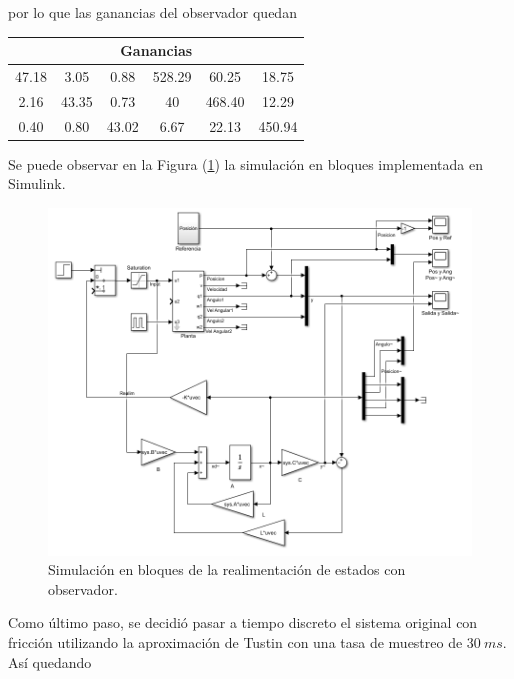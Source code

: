 por lo que las ganancias del observador quedan

\begin{table}[H]
\centering
\begin{tabular}{@{}cccccc@{}}
\toprule
\multicolumn{6}{c}{Ganancias}                    \\ \midrule
47.18 & 3.05  & 0.88  & 528.29 & 60.25  & 18.75  \\
2.16  & 43.35 & 0.73  & 40     & 468.40 & 12.29  \\
0.40  & 0.80  & 43.02 & 6.67   & 22.13  & 450.94 \\ \bottomrule
\end{tabular}
\end{table}

Se puede observar en la Figura (\ref{fig:obsv}) la simulación en bloques implementada en Simulink.

\begin{figure}[H]
	\centering
	\includegraphics[width=\linewidth]{../Modelo de Control/ImagenesModelo de Control/obsv.png}
	\caption{Simulación en bloques de la realimentación de estados con observador.}	
	\label{fig:obsv}
\end{figure}


Como último paso, se decidió pasar a tiempo discreto el sistema original con fricción utilizando la aproximación de Tustin con una tasa de muestreo de $30 \ ms$. Así quedando

